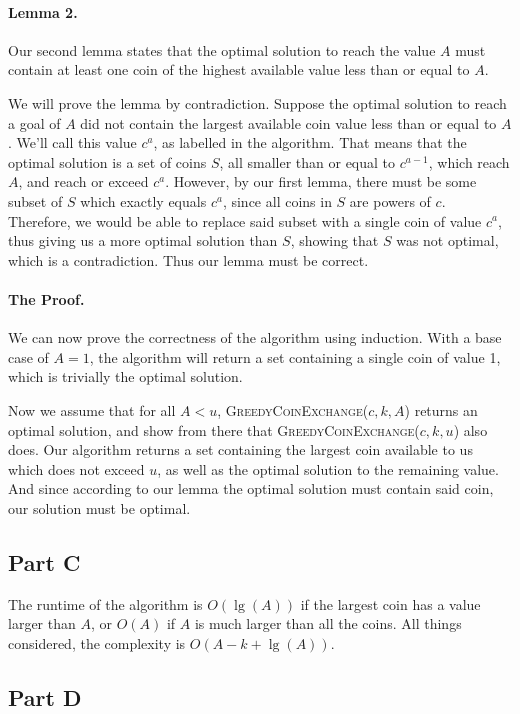 \documentclass{article}
\begin{document}
\paragraph{Lemma 2.} Our second lemma states that the optimal solution to reach the value \(A\) must contain at least one coin of the highest available value less than or equal to \(A\).

We will prove the lemma by contradiction. Suppose the optimal solution to reach a goal of \(A\) did not contain the largest available coin value less than or equal to \(A\). We'll call this value \(c^a\), as labelled in the algorithm. That means that the optimal solution is a set of coins \(S\), all smaller than or equal to \(c^{a-1}\), which reach \(A\), and reach or exceed \(c^a\). However, by our first lemma, there must be some subset of \(S\) which exactly equals \(c^a\), since all coins in \(S\) are powers of \(c\). Therefore, we would be able to replace said subset with a single coin of value \(c^a\), thus giving us a more optimal solution than \(S\), showing that \(S\) was not optimal, which is a contradiction. Thus our lemma must be correct.

\paragraph{The Proof.} We can now prove the correctness of the algorithm using induction. With a base case of \(A=1\), the algorithm will return a set containing a single coin of value 1, which is trivially the optimal solution.

Now we assume that for all \(A < u\), \textsc{GreedyCoinExchange}(\(c, k, A\)) returns an optimal solution, and show from there that \textsc{GreedyCoinExchange}(\(c, k, u\)) also does. Our algorithm returns a set containing the largest coin available to us which does not exceed \(u\), as well as the optimal solution to the remaining value. And since according to our lemma the optimal solution must contain said coin, our solution must be optimal.

\subsection*{Part C}

The runtime of the algorithm is \(O(\lg(A))\) if the largest coin has a value larger than \(A\), or \(O(A)\) if \(A\) is much larger than all the coins. All things considered, the complexity is \(O(A-k+\lg(A))\).

\subsection*{Part D}
\end{document}

